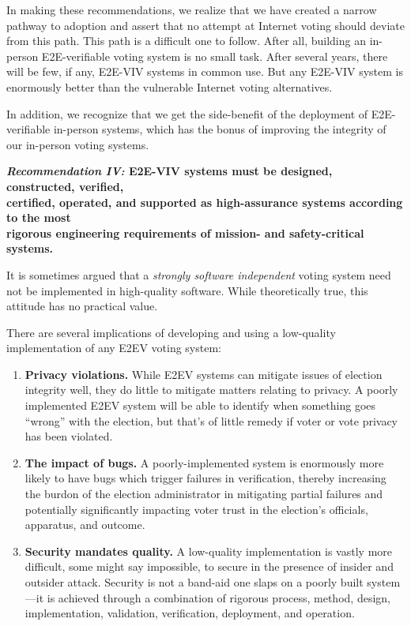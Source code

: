 In making these recommendations, we realize that we have created a
narrow pathway to adoption and assert that no attempt at Internet
voting should deviate from this path.  This path is a difficult one to
follow.  After all, building an in-person E2E-verifiable voting system
is no small task.  After several years, there will be few, if any,
E2E-VIV systems in common use.  But any E2E-VIV system is enormously
better than the vulnerable Internet voting alternatives.  

In addition, we recognize that we get the side-benefit of the
deployment of E2E-verifiable in-person systems, which has the bonus of
improving the integrity of our in-person voting systems.

\begin{center}
  \textbf{\emph{Recommendation IV:} E2E-VIV systems must be designed,
    constructed, verified,\\
    certified, operated, and supported as high-assurance systems
    according to the most\\
    rigorous engineering requirements of mission- and safety-critical
    systems.}
\end{center}

It is sometimes argued that a \emph{strongly software independent}
voting system need not be implemented in high-quality software. While
theoretically true, this attitude has no practical value.

There are several implications of developing and using a low-quality
implementation of any E2EV voting system:
\begin{enumerate}
\item \textbf{Privacy violations. }While E2EV systems can mitigate
  issues of election integrity well, they do little to mitigate
  matters relating to privacy.  A poorly implemented E2EV system will
  be able to identify when something goes ``wrong'' with the election,
  but that's of little remedy if voter or vote privacy has been
  violated.
\item \textbf{The impact of bugs.} A poorly-implemented system is
  enormously more likely to have bugs which trigger failures in
  verification, thereby increasing the burdon of the election
  administrator in mitigating partial failures and potentially
  significantly impacting voter trust in the election's officials,
  apparatus, and outcome.
\item \textbf{Security mandates quality.} A low-quality implementation
  is vastly more difficult, some might say impossible, to secure in
  the presence of insider and outsider attack. Security is not a
  band-aid one slaps on a poorly built system---it is achieved through
  a combination of rigorous process, method, design, implementation,
  validation, verification, deployment, and operation.
\end{enumerate}

